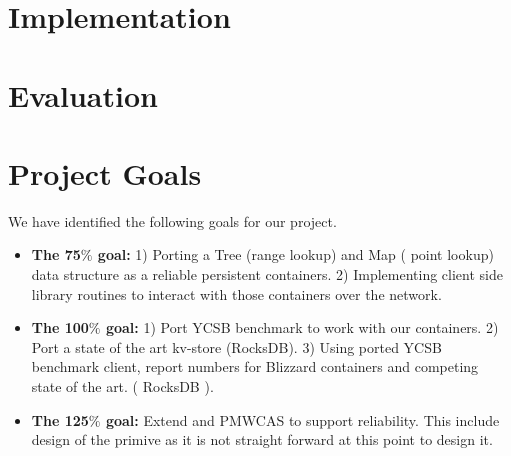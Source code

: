 \section{Implementation}



\section{Evaluation}
\section{Project Goals}
We have identified the following goals for our project.
\begin{itemize}
	\item {\bf The 75$\%$ goal:} 1) Porting a Tree (range lookup) and Map ( point lookup) data structure as a reliable persistent containers. 2) Implementing
			client side library routines to interact with those containers over the network. 

		\item {\bf The 100$\%$ goal:} 1) Port YCSB benchmark to work with our containers. 2) Port a state of the art kv-store (RocksDB). 
				3) Using ported YCSB benchmark client, report numbers for Blizzard containers and competing state of the art. ( RocksDB ).

\item {\bf The 125$\%$ goal:} Extend and PMWCAS to support reliability. This include design of the primive as it is not straight forward at this
		point to design it.

\end{itemize}
